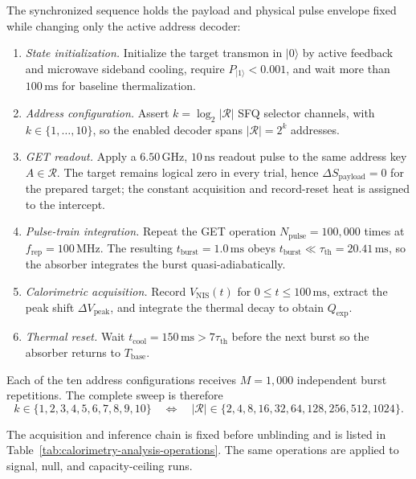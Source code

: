 \documentclass[11pt,letterpaper]{article}
\theoremstyle{plain}
\begin{document}
The synchronized sequence holds the payload and physical pulse envelope fixed
while changing only the active address decoder:
\begin{enumerate}
 \item \emph{State initialization.}  Initialize the target transmon in
 \(|0\rangle\) by active feedback and microwave sideband cooling, require
 \(P_{|1\rangle}<0.001\), and wait more than \(100\,\mathrm{ms}\) for baseline
 thermalization.

 \item \emph{Address configuration.}  Assert \(k=\log_2|\mathcal R|\) SFQ
 selector channels, with \(k\in\{1,\ldots,10\}\), so the enabled decoder spans
 \(|\mathcal R|=2^k\) addresses.

 \item \emph{GET readout.}  Apply a \(6.50\,\mathrm{GHz}\),
 \(10\,\mathrm{ns}\) readout pulse to the same address key
 \(A\in\mathcal R\).  The target remains logical zero in every trial, hence
 \(\Delta S_{\text{payload}}=0\) for the prepared target; the constant acquisition
 and record-reset heat is assigned to the intercept.

 \item \emph{Pulse-train integration.}  Repeat the GET operation
 \(N_{\text{pulse}}=100{,}000\) times at \(f_{\text{rep}}=100\,\mathrm{MHz}\).  The
 resulting \(t_{\text{burst}}=1.0\,\mathrm{ms}\) obeys
 \(t_{\text{burst}}\ll\tau_{\text{th}}=20.41\,\mathrm{ms}\), so the absorber
 integrates the burst quasi-adiabatically.

 \item \emph{Calorimetric acquisition.}  Record \(V_{\text{NIS}}(t)\) for
 \(0\le t\le100\,\mathrm{ms}\), extract the peak shift
 \(\Delta V_{\text{peak}}\), and integrate the thermal decay to obtain
 \(Q_{\text{exp}}\).

 \item \emph{Thermal reset.}  Wait
 \(t_{\text{cool}}=150\,\mathrm{ms}>7\tau_{\text{th}}\) before the next burst so the
 absorber returns to \(T_{\text{base}}\).
\end{enumerate}
Each of the ten address configurations receives \(M=1{,}000\) independent
burst repetitions.  The complete sweep is therefore
\begin{equation}
\label{eq:calorimetry-discrete-sweep}
 k\in\{1,2,3,4,5,6,7,8,9,10\}
 \quad\Longleftrightarrow\quad
 |\mathcal R|\in\{2,4,8,16,32,64,128,256,512,1024\}.
\end{equation}

The acquisition and inference chain is fixed before unblinding and is listed
in Table~\ref{tab:calorimetry-analysis-operations}.  The same operations are
applied to signal, null, and capacity-ceiling runs.
\end{document}
